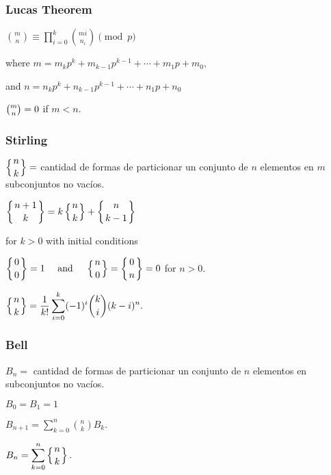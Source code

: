 {{%

\subsubsection{Lucas Theorem}
{
    \(\displaystyle {\binom {m}{n}}\equiv \prod_{i=0}^{k}{\binom {m{i}}{n_{i}}}{\pmod{p}}\)

where \({\displaystyle m=m_{k}p^{k}+m_{k-1}p^{k-1}+\cdots +m_{1}p+m_{0},}\)

and \({\displaystyle n=n_{k}p^{k}+n_{k-1}p^{k-1}+\cdots +n_{1}p+n_{0}}\)

\({\displaystyle {\tbinom {m}{n}}=0}\) if \(m < n\).


}
\subsubsection{Stirling}
{
\(\displaystyle \left\{{n \atop k}\right\} = \) cantidad de formas de particionar un conjunto de \(n\) elementos en \(m\) subconjuntos no vacíos.

\(\displaystyle \left\{{n+1\atop k}\right\} = k \left\{{ n \atop k }\right\} + \left\{{n\atop k-1}\right\}\)

for \(k > 0\) with initial conditions

\({\displaystyle \left\{{0 \atop 0}\right\}=1\quad {\mbox{ and }}\quad \left\{{n \atop 0}\right\}=\left\{{0 \atop n}\right\}=0}\)
for \(n > 0\).




\( {\displaystyle \left\{{n \atop k}\right\}={\frac {1}{k!}}\sum_{i=0}^{k}(-1)^{i}{\binom {k}{i}}(k-i)^{n}.} \)
}
\subsubsection{Bell}
{
\( {\displaystyle B_{n}=} \) cantidad de formas de particionar un conjunto de \(n\) elementos en subconjuntos no vacíos.

\( {\displaystyle B_0= B_1 = 1} \)

\( {\displaystyle B_{n+1}=\sum_{k=0}^{n} \binom{n}{k} B_k.} \) 

\( {\displaystyle B_{n}=\sum _{k=0}^{n}\left\{{n \atop k}\right\}.} \) 


}}}
